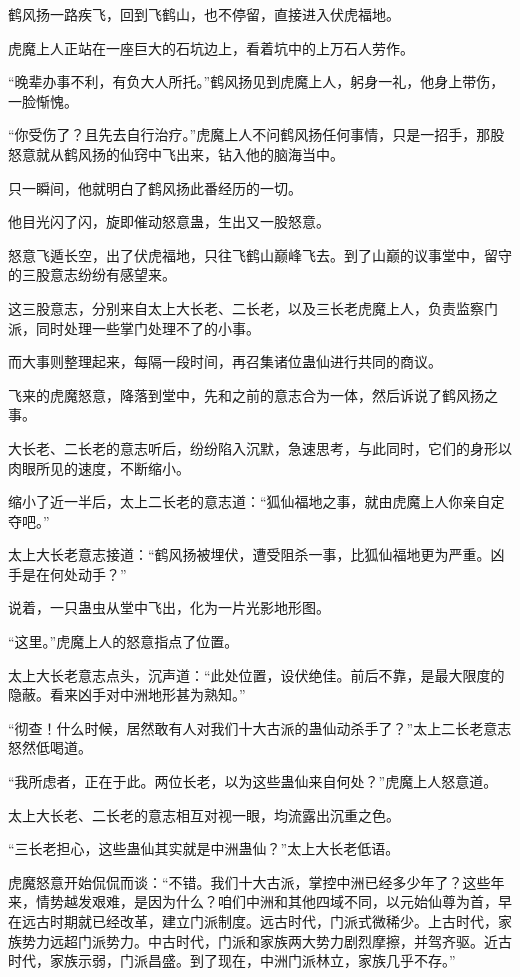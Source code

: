 \begin{this_body}
鹤风扬一路疾飞，回到飞鹤山，也不停留，直接进入伏虎福地。

虎魔上人正站在一座巨大的石坑边上，看着坑中的上万石人劳作。

“晚辈办事不利，有负大人所托。”鹤风扬见到虎魔上人，躬身一礼，他身上带伤，一脸惭愧。

“你受伤了？且先去自行治疗。”虎魔上人不问鹤风扬任何事情，只是一招手，那股怒意就从鹤风扬的仙窍中飞出来，钻入他的脑海当中。

只一瞬间，他就明白了鹤风扬此番经历的一切。

他目光闪了闪，旋即催动怒意蛊，生出又一股怒意。

怒意飞遁长空，出了伏虎福地，只往飞鹤山巅峰飞去。到了山巅的议事堂中，留守的三股意志纷纷有感望来。

这三股意志，分别来自太上大长老、二长老，以及三长老虎魔上人，负责监察门派，同时处理一些掌门处理不了的小事。

而大事则整理起来，每隔一段时间，再召集诸位蛊仙进行共同的商议。

飞来的虎魔怒意，降落到堂中，先和之前的意志合为一体，然后诉说了鹤风扬之事。

大长老、二长老的意志听后，纷纷陷入沉默，急速思考，与此同时，它们的身形以肉眼所见的速度，不断缩小。

缩小了近一半后，太上二长老的意志道：“狐仙福地之事，就由虎魔上人你亲自定夺吧。”

太上大长老意志接道：“鹤风扬被埋伏，遭受阻杀一事，比狐仙福地更为严重。凶手是在何处动手？”

说着，一只蛊虫从堂中飞出，化为一片光影地形图。

“这里。”虎魔上人的怒意指点了位置。

太上大长老意志点头，沉声道：“此处位置，设伏绝佳。前后不靠，是最大限度的隐蔽。看来凶手对中洲地形甚为熟知。”

“彻查！什么时候，居然敢有人对我们十大古派的蛊仙动杀手了？”太上二长老意志怒然低喝道。

“我所虑者，正在于此。两位长老，以为这些蛊仙来自何处？”虎魔上人怒意道。

太上大长老、二长老的意志相互对视一眼，均流露出沉重之色。

“三长老担心，这些蛊仙其实就是中洲蛊仙？”太上大长老低语。

虎魔怒意开始侃侃而谈：“不错。我们十大古派，掌控中洲已经多少年了？这些年来，情势越发艰难，是因为什么？咱们中洲和其他四域不同，以元始仙尊为首，早在远古时期就已经改革，建立门派制度。远古时代，门派式微稀少。上古时代，家族势力远超门派势力。中古时代，门派和家族两大势力剧烈摩擦，并驾齐驱。近古时代，家族示弱，门派昌盛。到了现在，中洲门派林立，家族几乎不存。”


\end{this_body}

